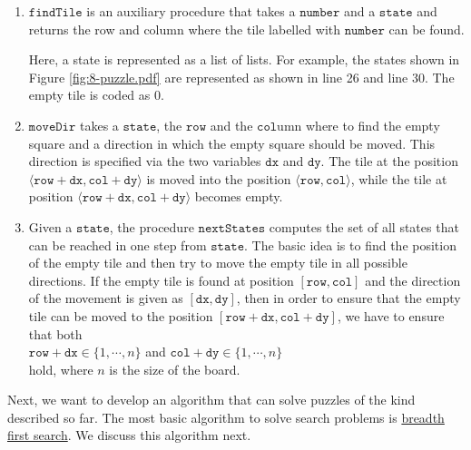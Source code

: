 \begin{enumerate}
\item $\mathtt{findTile}$ is an auxiliary procedure that takes a $\mathtt{number}$ and a $\mathtt{state}$ and
      returns the row and column where the tile labelled with $\mathtt{number}$ can be found.

      Here, a state is represented as a list of lists.  For example, the states shown in Figure
      \ref{fig:8-puzzle.pdf} are represented as shown in line 26 and line 30.  The empty tile is
      coded as $0$.
\item $\mathtt{moveDir}$ takes a $\mathtt{state}$, the $\mathtt{row}$ and the $\mathtt{col}$umn
      where to find the empty square and a direction in which the empty square should be moved.
      This direction is specified via the two variables $\mathtt{dx}$ and $\mathtt{dy}$.  The tile
      at the position $\langle\mathtt{row} + \mathtt{dx}, \mathtt{col} + \mathtt{dy}\rangle$ is
      moved into the position $\langle\mathtt{row}, \mathtt{col}\rangle$, while the tile at position
      $\langle\mathtt{row} + \mathtt{dx}, \mathtt{col} + \mathtt{dy}\rangle$ becomes empty.
\item Given a $\mathtt{state}$, the procedure $\mathtt{nextStates}$ computes the set of all states
      that can be reached in one step from $\mathtt{state}$.  The basic idea is to find the position of the
      empty tile and then try to move the empty tile in all possible directions.  If the empty tile is found at
      position $[\mathtt{row}, \mathtt{col}]$ and the direction of the movement is given as $[\mathtt{dx}, \mathtt{dy}]$, then
      in order to ensure that the empty tile can be moved to the position $[\mathtt{row}+\mathtt{dx}, \mathtt{col}+\mathtt{dy}]$,
      we have to ensure that both
      \\[0.2cm]
      \hspace*{1.3cm}
      $\mathtt{row}+\mathtt{dx} \in \{1,\cdots,n\}$ \quad and \quad
      $\mathtt{col}+\mathtt{dy} \in \{1,\cdots,n\}$
      \\[0.2cm]
      hold, where $n$ is the size of the board.
\end{enumerate}

Next, we want to develop an algorithm that can solve puzzles of the kind described so far.  The most basic
algorithm to solve search problems is \href{https://en.wikipedia.org/wiki/Breadth-first_search}{breadth first search}.
We discuss this algorithm next.

